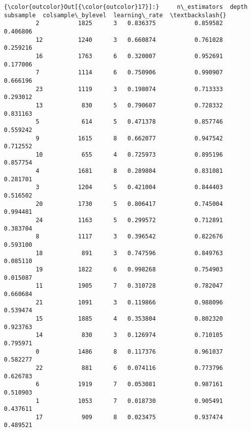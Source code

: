 \documentclass[11pt]{article}
\begin{document}
\begin{Verbatim}[commandchars=\\\{\}]
{\color{outcolor}Out[{\color{outcolor}17}]:}     n\_estimators  depth  subsample  colsample\_bylevel  learning\_rate  \textbackslash{}
         2           1825      3   0.836375           0.859582       0.406806   
         12          1240      3   0.660874           0.761028       0.259216   
         16          1763      6   0.320007           0.952691       0.177006   
         7           1114      6   0.750906           0.990907       0.666196   
         23          1119      3   0.198074           0.713333       0.293012   
         13           830      5   0.790607           0.728332       0.831163   
         5            614      5   0.471378           0.857746       0.559242   
         9           1615      8   0.662077           0.947542       0.712552   
         10           655      4   0.725973           0.895196       0.857754   
         4           1681      8   0.289804           0.831081       0.281701   
         3           1204      5   0.421004           0.844403       0.516502   
         20          1730      5   0.806417           0.745004       0.994481   
         24          1163      5   0.299572           0.712891       0.383704   
         8           1117      3   0.396542           0.822676       0.593100   
         18           891      3   0.747596           0.849763       0.085110   
         19          1822      6   0.998268           0.754903       0.015087   
         11          1905      7   0.310728           0.782047       0.660684   
         21          1091      3   0.119866           0.988096       0.539474   
         15          1885      4   0.353804           0.802320       0.923763   
         14           830      3   0.126974           0.710105       0.795971   
         0           1486      8   0.117376           0.961037       0.582277   
         22           881      6   0.074116           0.773796       0.626783   
         6           1919      7   0.053081           0.987161       0.510903   
         1           1053      7   0.018730           0.905491       0.437611   
         17           909      8   0.023475           0.937474       0.489521   
         

\end{Verbatim}
\end{document}
